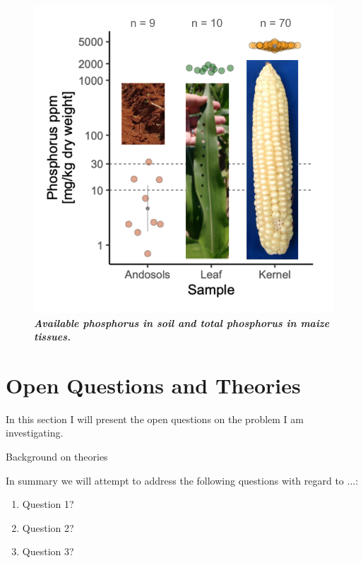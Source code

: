 \begin{figure}[htp]
\centering
\includegraphics[width=0.5\linewidth]{Chapter-0/figs/P_soil_tissue.png}
\caption[Available phosphorus in soil and total phosphorus in maize tissues]
{\textit{\textbf{Available phosphorus in soil and total phosphorus in maize tissues.}}}
\label{fig::P_soil_tissue}
\end{figure}

\section{Open Questions and Theories}
\label{sec:que}

In this section I will present the open questions on the problem I am investigating. 


Background on theories

In summary we will attempt to address the following questions with regard to ...:
\begin{enumerate}
\item Question 1?
\item Question 2?
\item Question 3?
\end{enumerate}
